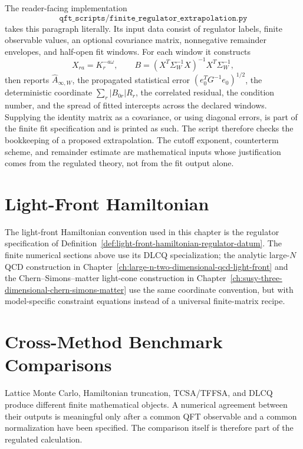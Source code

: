 The reader-facing implementation
\[
  \texttt{qft\_scripts/finite\_regulator\_extrapolation.py}
\]
takes this paragraph literally.  Its input data consist of regulator labels,
finite observable values, an optional covariance matrix, nonnegative
remainder envelopes, and half-open fit windows.  For each window it constructs
\[
  X_{ra}=K_r^{-a\omega},\qquad
  B=(X^T\Sigma_W^{-1}X)^{-1}X^T\Sigma_W^{-1},
\]
then reports \(\widehat A_{\infty,W}\), the propagated statistical error
\((e_0^TG^{-1}e_0)^{1/2}\), the deterministic coordinate
\(\sum_r |B_{0r}|R_r\), the correlated residual, the condition number, and
the spread of fitted intercepts across the declared windows.  Supplying the
identity matrix as a covariance, or using diagonal errors, is part of the
finite fit specification and is printed as such.  The script therefore checks the
bookkeeping of a proposed extrapolation.  The cutoff exponent, counterterm
scheme, and remainder estimate are mathematical inputs whose justification
comes from the regulated theory, not from the fit output alone.

\section{Light-Front Hamiltonian}

The light-front Hamiltonian convention used in this chapter is the regulator
specification of Definition~\ref{def:light-front-hamiltonian-regulator-datum}.  The
finite numerical sections above use its DLCQ specialization; the analytic
large-\(N\) QCD construction in
Chapter~\ref{ch:large-n-two-dimensional-qcd-light-front} and the
Chern--Simons--matter light-cone construction in
Chapter~\ref{ch:susy-three-dimensional-chern-simons-matter} use the same
coordinate convention, but with model-specific constraint equations instead
of a universal finite-matrix recipe.

\section{Cross-Method Benchmark Comparisons}
\label{sec:cross-method-numerical-benchmark-comparisons}

Lattice Monte Carlo, Hamiltonian truncation, TCSA/TFFSA, and DLCQ produce
different finite mathematical objects.  A numerical agreement between their
outputs is meaningful only after a common QFT observable and a common
normalization have been specified.  The comparison itself is therefore part
of the regulated calculation.

